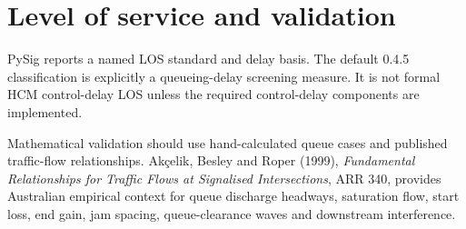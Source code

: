\chapter{Level of service and validation}
PySig reports a named LOS standard and delay basis. The default 0.4.5
classification is explicitly a queueing-delay screening measure. It is not
formal HCM control-delay LOS unless the required control-delay components are
implemented.

Mathematical validation should use hand-calculated queue cases and published
traffic-flow relationships. Ak\c{c}elik, Besley and Roper (1999),
\textit{Fundamental Relationships for Traffic Flows at Signalised
Intersections}, ARR 340, provides Australian empirical context for queue
discharge headways, saturation flow, start loss, end gain, jam spacing,
queue-clearance waves and downstream interference.
